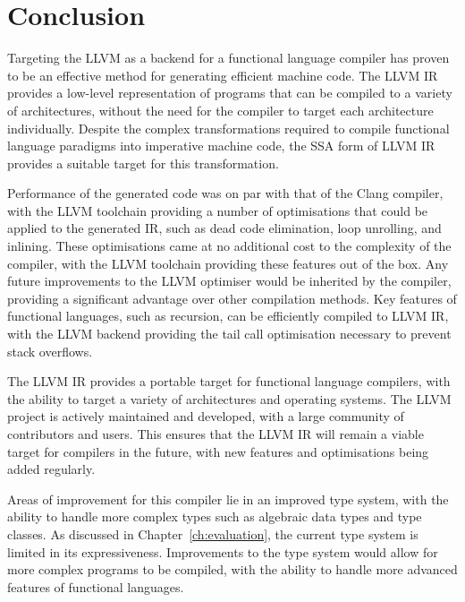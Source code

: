 \chapter{Conclusion}
\label{ch:conclusion}

Targeting the LLVM as a backend for a functional language compiler has proven to be an effective
method for generating efficient machine code. The LLVM IR provides a low-level representation of
programs that can be compiled to a variety of architectures, without the need for the compiler to
target each architecture individually. Despite the complex transformations required to compile
functional language paradigms into imperative machine code, the SSA form of LLVM IR provides a
suitable target for this transformation.

Performance of the generated code was on par with that of the Clang compiler, with the LLVM
toolchain providing a number of optimisations that could be applied to the generated IR, such as
dead code elimination, loop unrolling, and inlining. These optimisations came at no additional cost
to the complexity of the compiler, with the LLVM toolchain providing these features out of the box.
Any future improvements to the LLVM optimiser would be inherited by the compiler, providing a
significant advantage over other compilation methods. Key features of functional languages, such as
recursion, can be efficiently compiled to LLVM IR, with the LLVM backend providing the tail call
optimisation necessary to prevent stack overflows.

The LLVM IR provides a portable target for functional language compilers, with the ability to target
a variety of architectures and operating systems. The LLVM project is actively maintained and
developed, with a large community of contributors and users. This ensures that the LLVM IR will
remain a viable target for compilers in the future, with new features and optimisations being added
regularly.

Areas of improvement for this compiler lie in an improved type system, with the ability to handle
more complex types such as algebraic data types and type classes. As discussed in
Chapter~\ref{ch:evaluation}, the current type system is limited in its expressiveness. Improvements
to the type system would allow for more complex programs to be compiled, with the ability to handle
more advanced features of functional languages.
